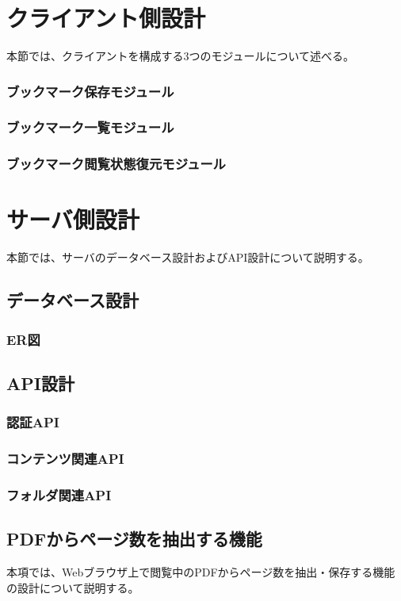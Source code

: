 \section{クライアント側設計}
本節では、クライアントを構成する3つのモジュールについて述べる。

\subsubsection{ブックマーク保存モジュール}
\subsubsection{ブックマーク一覧モジュール}
\subsubsection{ブックマーク閲覧状態復元モジュール}

\section{サーバ側設計}
本節では、サーバのデータベース設計およびAPI設計について説明する。

\subsection{データベース設計}

\subsubsection{ER図}

\subsection{API設計}
\subsubsection{認証API}
\subsubsection{コンテンツ関連API}
\subsubsection{フォルダ関連API}

\subsection{PDFからページ数を抽出する機能}
本項では、Webブラウザ上で閲覧中のPDFからページ数を抽出・保存する機能の設計について説明する。

